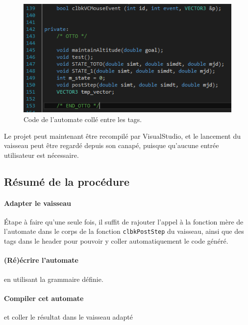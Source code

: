 \documentclass[a4paper,11pt]{article}
\begin{document}
        \begin{figure}[!h]
            \begin{center}
                \includegraphics{img/code_header.png}
                \caption{Code de l'automate collé entre les tags.}
            \end{center}
        \end{figure}
        
            Le projet peut maintenant être recompilé par VisualStudio, et le lancement du vaisseau peut être regardé depuis son canapé, puisque qu'aucune entrée utilisateur est nécessaire.
            
    \subsection{Résumé de la procédure}
        \paragraph{Adapter le vaisseau}
            \'Etape à faire qu'une seule fois, il suffit de rajouter l'appel à la fonction mère de l'automate dans le corps de la fonction \verb|clbkPostStep| du vaisseau, ainsi que des tags dans le header pour pouvoir y coller automatiquement le code généré.
            
        \paragraph{(Ré)écrire l'automate} en utilisant la grammaire définie.
        
        \paragraph{Compiler cet automate} et coller le résultat dans le vaisseau adapté
        
\end{document}
